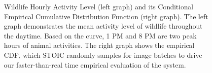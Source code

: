 \begin{figure}
\begin{minipage}{.45\textwidth}
\end{minipage}
\caption{Wildlife Hourly Activity Level (left graph) and its Conditional Empirical Cumulative Distribution Function (right graph). The left graph demonstrates the mean activity level of wildlife throughout the daytime. Based on the curve, 1 PM and 8 PM are two peak hours of animal activities.  The right graph shows the empirical CDF, which STOIC randomly samples for image batches to drive our faster-than-real time empirical evaluation of the system.\label{fig:hour_act_and_cdf}}
\end{figure}

